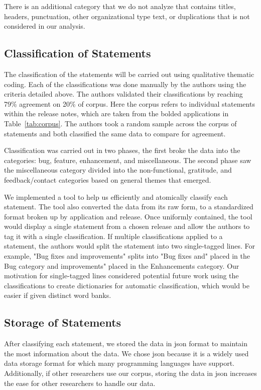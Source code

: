 \documentclass{acm_proc_article-sp}
\begin{document}
There is an additional category that we do not analyze that contains titles, headers, punctuation, other organizational type text, or duplications that is not considered in our analysis.

\subsection{Classification of Statements}
The classification of the statements will be carried out using qualitative thematic coding. 
Each of the classifications was done manually by the authors using the criteria detailed above.
The authors validated their classifications by reaching 79\% agreement on 20\% of corpus.
Here the corpus refers to individual statements within the release notes, which are taken from the bolded applications in Table~\ref{tab:corpus}.
The authors took a random sample across the corpus of statements and both classified the same data to compare for agreement. 

Classification was carried out in two phases, the first broke the data into the categories: bug, feature, enhancement, and miscellaneous.
The second phase saw the miscellaneous category divided into the non-functional, gratitude, and feedback/contact categories based on general themes that emerged.

We implemented a tool to help us efficiently and atomically classify each statement.
The tool also converted the data from its raw form, to a standardized format broken up by application and release.
Once uniformly contained, the tool would display a single statement from a chosen release and allow the authors to tag it with a single classification. 
If multiple classifications applied to a statement, the authors would split the statement into two single-tagged lines.
For example, "Bug fixes and improvements" splits into "Bug fixes and" placed in the Bug category and improvements" placed in the Enhancements category.
Our motivation for single-tagged lines considered potential future work using the classifications to create dictionaries for automatic classification, which would be easier if given distinct word banks.



\subsection{Storage of Statements}
After classifying each statement, we stored the data in json format to maintain the most information about the data.
We chose json because it is a widely used data storage format for which many programming languages have support. 
Additionally, if other researchers use our corpus, storing the data in json increases the ease for other researchers to handle our data.
\end{document}
